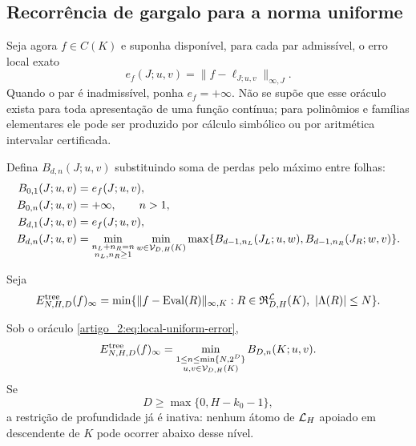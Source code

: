 \subsection{Recorrência de gargalo para a norma uniforme}

Seja agora $f\in C(K)$ e suponha disponível, para cada par admissível, o erro
local exato
\begin{equation}
 e_f(J;u,v)=\|f-\ell_{J;u,v}\|_{\infty,J}.
 \label{artigo_2:eq:local-uniform-error}
\end{equation}
Quando o par é inadmissível, ponha $e_f=+\infty$. Não se supõe que esse oráculo
exista para toda apresentação de uma função contínua; para polinômios e
famílias elementares ele pode ser produzido por cálculo simbólico ou por
aritmética intervalar certificada.

Defina $B_{d,n}(J;u,v)$ substituindo soma de perdas pelo máximo entre folhas:
\begin{align}
 B_{0,1}(J;u,v)&=e_f(J;u,v),\label{artigo_2:eq:bottleneck-base}\\
 B_{0,n}(J;u,v)&=+\infty,\qquad n>1,\notag\\
 B_{d,1}(J;u,v)&=e_f(J;u,v),\label{artigo_2:eq:bottleneck-one}\\
 B_{d,n}(J;u,v)
 &=\min_{\substack{n_L+n_R=n\\n_L,n_R\ge1}}
 \min_{w\in\mathcal{V}_{D,H}(K)}
 \max\{B_{d-1,n_L}(J_L;u,w),
       B_{d-1,n_R}(J_R;w,v)\}.
 \label{artigo_2:eq:bottleneck-recurrence}
\end{align}

Seja
\begin{equation}
 E_{N,H,D}^{\rm tree}(f)_\infty
 =\min\{\|f-\operatorname{Eval}(R)\|_{\infty,K}:
 R\in\mathfrak{R}_{D,H}^{\mathcal{L}}(K),\
 |\Lambda(R)|\le N\}.
 \label{artigo_2:eq:truncated-tree-error}
\end{equation}

\begin{theorem}\label{map:artigo_2:8.2}
\label{artigo_2:thm:bottleneck}
Sob o oráculo \eqref{artigo_2:eq:local-uniform-error},
\begin{equation}
 E_{N,H,D}^{\rm tree}(f)_\infty
 =\min_{\substack{1\le n\le\min\{N,2^D\}\\
                  u,v\in\mathcal{V}_{D,H}(K)}}
 B_{D,n}(K;u,v).
 \label{artigo_2:eq:bottleneck-optimum}
\end{equation}
Se
\begin{equation}
 D\ge \max\{0,H-k_0-1\},
 \label{artigo_2:eq:depth-inactive}
\end{equation}
a restrição de profundidade já é inativa: nenhum átomo de $\mathcal{L}_H$
apoiado em descendente de $K$ pode ocorrer abaixo desse nível.
\end{theorem}

